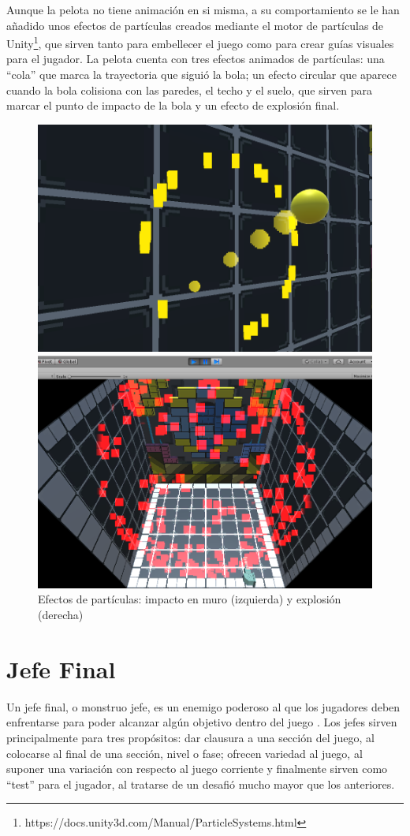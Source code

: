 Aunque la pelota no tiene animación en si misma, a su comportamiento se le han añadido unos efectos de partículas creados mediante el motor de partículas de Unity\footnote{https://docs.unity3d.com/Manual/ParticleSystems.html}, que sirven tanto para embellecer el juego como para crear guías visuales para el jugador. La pelota cuenta con tres efectos animados de partículas: una ``cola'' que marca la trayectoria que siguió la bola; un efecto circular que aparece cuando la bola colisiona con las paredes, el techo y el suelo, que sirven para marcar el punto de impacto de la bola y un efecto de explosión final.
\begin{figure}[!htb]
   \begin{minipage}{0.48\textwidth}
     \centering
     \includegraphics[width=0.7\linewidth, right]{images/estructura/fisica/ball_hit}
   \end{minipage}\hfill
   \begin {minipage}{0.48\textwidth}
     \centering
     \includegraphics[width=0.7\linewidth, left]{images/estructura/fisica/ball_explosion}
   \end{minipage}
   \caption{Efectos de partículas: impacto en muro (izquierda) y explosión (derecha)}
\end{figure}

\section{Jefe Final}
Un jefe final, o monstruo jefe, es un enemigo poderoso al que los jugadores deben enfrentarse para poder alcanzar algún objetivo dentro del juego \cite{game-design-patterns}. Los jefes sirven principalmente para tres propósitos: dar clausura a una sección del juego, al colocarse al final de una sección, nivel o fase; ofrecen variedad al juego, al suponer una variación con respecto al juego corriente y finalmente sirven como ``test'' para el jugador, al tratarse de un desafió mucho mayor que los anteriores. 

